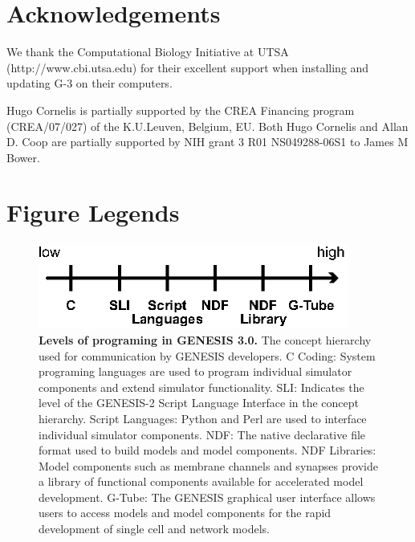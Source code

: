 \documentclass[10pt]{article}
\begin{document}
\section*{Acknowledgements}

We thank the Computational Biology Initiative at UTSA (http://www.cbi.utsa.edu) for their excellent support when installing and updating G-3 on their computers.

Hugo Cornelis is partially supported by the CREA Financing program (CREA/07/027) of the K.U.Leuven, Belgium, EU. Both Hugo Cornelis and Allan D. Coop are partially supported by NIH grant 3 R01 NS049288-06S1 to James M Bower.



\newpage

\section*{Figure Legends}

\begin{figure}[ht]
\begin{center}
\includegraphics[width=4in]{figures/g3-interfacing.eps}
\end{center}
\caption{
{\bf Levels of programing in GENESIS 3.0.} The concept hierarchy used for communication by GENESIS developers. C Coding: System programing languages are used to program individual simulator components and extend simulator functionality. SLI: Indicates the level of the GENESIS-2 Script Language Interface in the concept hierarchy. Script Languages: Python and Perl are used to interface individual simulator components. NDF: The native declarative file format used to build models and model components. NDF Libraries: Model components such as membrane channels and synapses provide a library of functional components available for accelerated model development. G-Tube: The GENESIS graphical user interface allows users to access models and model components for the rapid development of single cell and network models.
}
\label{fig:g3-interfacing}
\end{figure}
\end{document}
